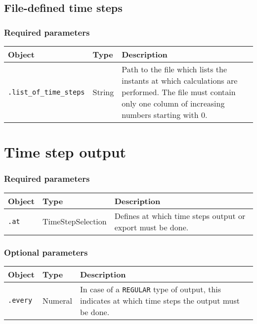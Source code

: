 \documentclass[10pt]{article}
\begin{document}
\subsection{File-defined time steps}

\subsubsection*{Required parameters}

\begin{tabularx}{\textwidth}{llX}
\hline 
Object & Type & Description \\ 
\hline 
\verb+.list_of_time_steps+ & String & Path to the file which lists the instants at which calculations are performed. The file must contain only one column of increasing numbers starting with 0.\\ 
\hline 
\end{tabularx}

\section{Time step output}

\subsubsection*{Required parameters}

\begin{tabularx}{\textwidth}{llX}
\hline 
Object & Type & Description \\ 
\hline 
\verb+.at+ & TimeStepSelection & Defines at which time steps output or export must be done. \\ 
\hline 
\end{tabularx}

\subsubsection*{Optional parameters}

\begin{tabularx}{\textwidth}{llX}
\hline 
Object & Type & Description \\ 
\hline 
\verb+.every+ & Numeral & In case of a \verb+REGULAR+ type of output, this indicates at which time steps the output must be done.\\
\hline 
\end{tabularx}
\end{document}
